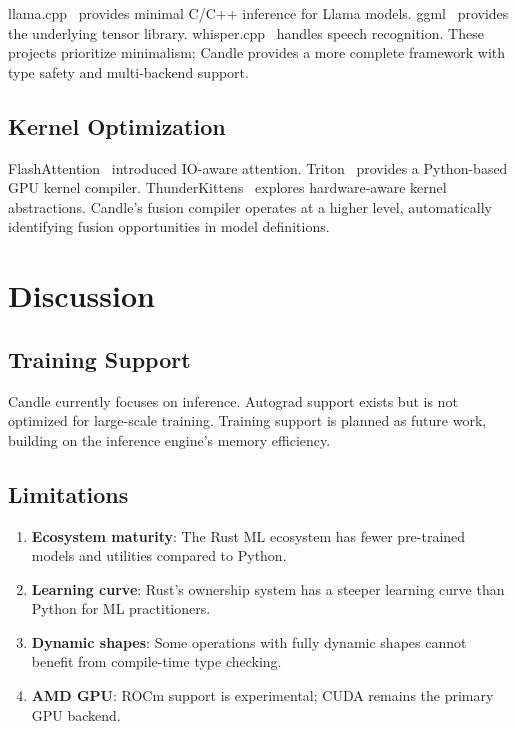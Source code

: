 \documentclass[11pt,twocolumn]{article}
\begin{document}
llama.cpp~\cite{llamacpp2023} provides minimal C/C++ inference for Llama models. ggml~\cite{ggml2023} provides the underlying tensor library. whisper.cpp~\cite{whispercpp2023} handles speech recognition. These projects prioritize minimalism; Candle provides a more complete framework with type safety and multi-backend support.

\subsection{Kernel Optimization}

FlashAttention~\cite{dao2022flashattention,dao2023flashattention2} introduced IO-aware attention. Triton~\cite{tillet2019triton} provides a Python-based GPU kernel compiler. ThunderKittens~\cite{thunderkittens2024} explores hardware-aware kernel abstractions. Candle's fusion compiler operates at a higher level, automatically identifying fusion opportunities in model definitions.

\section{Discussion}
\label{sec:discussion}

\subsection{Training Support}

Candle currently focuses on inference. Autograd support exists but is not optimized for large-scale training. Training support is planned as future work, building on the inference engine's memory efficiency.

\subsection{Limitations}

\begin{enumerate}[leftmargin=1.4em]
    \item \textbf{Ecosystem maturity}: The Rust ML ecosystem has fewer pre-trained models and utilities compared to Python.
    \item \textbf{Learning curve}: Rust's ownership system has a steeper learning curve than Python for ML practitioners.
    \item \textbf{Dynamic shapes}: Some operations with fully dynamic shapes cannot benefit from compile-time type checking.
    \item \textbf{AMD GPU}: ROCm support is experimental; CUDA remains the primary GPU backend.
\end{enumerate}
\end{document}
